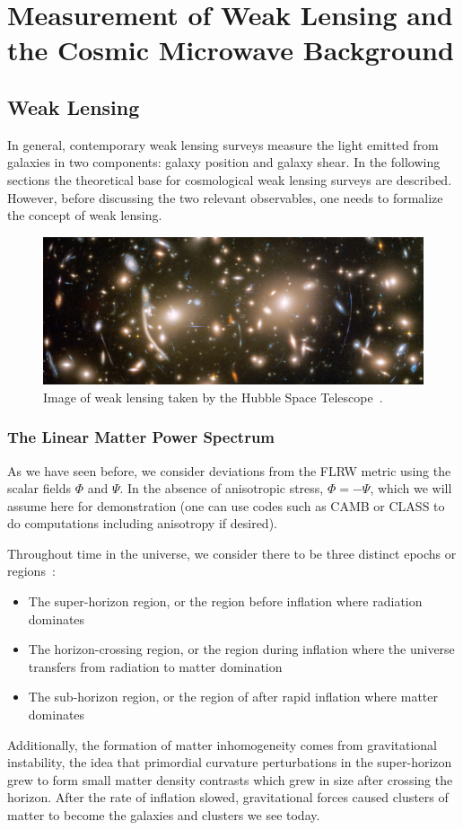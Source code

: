 \chapter{Measurement of Weak Lensing and the Cosmic Microwave Background}
\section{Weak Lensing}
In general, contemporary weak lensing surveys measure the light emitted from galaxies in two components: galaxy position and galaxy shear. In the following sections the theoretical base for cosmological weak lensing surveys are described. However, before discussing the two relevant observables, one needs to formalize the concept of weak lensing.
\begin{figure}[ht]
	\centering
	\includegraphics[width=\textwidth]{plots/hubble_weak_lensing.png}
	\caption{Image of weak lensing taken by the Hubble Space Telescope~\cite{hubble_lensing}.}
	\label{fig:weak_lensing}
\end{figure}
\subsection{The Linear Matter Power Spectrum}
As we have seen before, we consider deviations from the FLRW metric using the scalar fields $\Phi$ and $\Psi$. In the absence of anisotropic stress, $\Phi=-\Psi$, which we will assume here for demonstration (one can use codes such as CAMB or CLASS to do computations including anisotropy if desired). 

Throughout time in the universe, we consider there to be three distinct epochs or regions~\cite{scott_dodelson_modern_2021}:
\begin{itemize}
	\item The super-horizon region, or the region before inflation where radiation dominates
	\item The horizon-crossing region, or the region during inflation where the universe transfers from radiation to matter domination
	\item The sub-horizon region, or the region of after rapid inflation where matter dominates
\end{itemize}
Additionally, the formation of matter inhomogeneity comes from gravitational instability, the idea that primordial curvature perturbations in the super-horizon grew to form small matter density contrasts which grew in size after crossing the horizon. After the rate of inflation slowed, gravitational forces caused clusters of matter to become the galaxies and clusters we see today.

